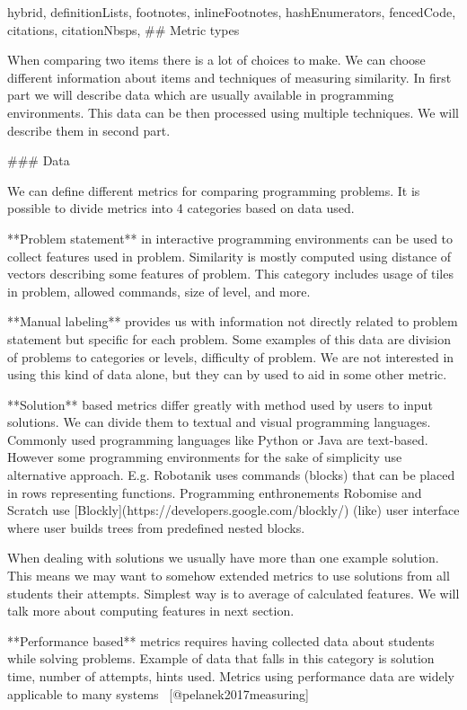 \documentclass[
  digital, %
  table,   %
  lof,     %
  lot,     %
]{fithesis3}
\begin{document}
\begin{markdown*}{%
  hybrid,
  definitionLists,
  footnotes,
  inlineFootnotes,
  hashEnumerators,
  fencedCode,
  citations,
  citationNbsps,
}
## Metric types

When comparing two items there is a lot of choices to make. We can choose different information about items and techniques of measuring similarity. In first part we will describe data which are usually available in programming environments. This data can be then processed using multiple techniques. We will describe them in second part.

### Data

We can define different metrics for comparing programming problems. It is possible to divide metrics into 4 categories based on data used.

**Problem statement** in interactive programming environments can be used to collect features used in problem. Similarity is mostly computed using distance of vectors describing some features of problem. This category includes usage of tiles in problem, allowed commands, size of level, and more.

**Manual labeling** provides us with information not directly related to problem statement but specific for each problem. Some examples of this data are division of problems to categories or levels, difficulty of problem. We are not interested in using this kind of data alone, but they can by used to aid in some other metric.

**Solution** based metrics differ greatly with method used by users to input solutions. We can divide them to textual and visual programming languages. Commonly used programming languages like Python or Java are text-based. However some programming environments for the sake of simplicity use alternative approach. E.g. Robotanik uses commands (blocks) that can be placed in rows representing functions. Programming enthronements Robomise and Scratch use [Blockly](https://developers.google.com/blockly/) (like) user interface where user builds trees from predefined nested blocks.

When dealing with solutions we usually have more than one example solution. This means we may want to somehow extended metrics to use solutions from all students their attempts. Simplest way is to average of calculated features. We will talk more about computing features in next section.

**Performance based** metrics requires having collected data about students while solving problems. Example of data that falls in this category is solution time, number of attempts, hints used. Metrics using performance data are widely applicable to many systems ~[@pelanek2017measuring]


\end{markdown*}
\end{document}
